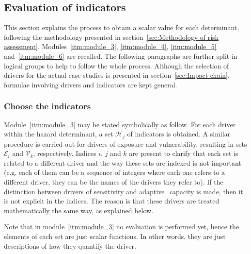 \subsection{Evaluation of indicators}
\label{sec:Evaluation of indicators}
This section explains the process to obtain a scalar value for each \gls{determinant}, following the methodology presented in section~\ref{sec:Methodology of risk assessment}. Modules~\ref{itm:module_3}, \ref{itm:module_4}, \ref{itm:module_5} and~\ref{itm:module_6} are recalled. The following paragraphs are further split in logical groups to help to follow the whole process.
Although the selection of \glspl{driver} for the actual case studies is presented in section~\ref{sec:Impact chain}, formulae involving \glspl{driver} and \glspl{indicator} are kept general.



\subsubsection{Choose the indicators}
Module~\ref{itm:module_3} may be stated symbolically as follow. For each \gls{driver} within the \gls{hazard} \gls{determinant}, a set $\mathcal{H}_j$ of \glspl{indicator} is obtained. A similar procedure is carried out for \glspl{driver} of \gls{exposure} and \gls{vulnerability}, resulting in sets $\mathcal{E}_i$ and $\mathcal{V}_k$, respectively. Indices $i$, $j$ and $k$ are present to clarify that each set is related to a different \gls{driver} and the way these sets are indexed is not important (e.g. each of them can be a sequence of integers where each one refers to a different \gls{driver}, they can be the names of the \glspl{driver} they refer to).
If the distinction between \glspl{driver} of \gls{sensitivity} and \gls{adaptive_capacity} is made, then it is not explicit in the indices. The reason is that these \glspl{driver} are treated mathematically the same way, as explained below.

Note that in module~\ref{itm:module_3} no evaluation is performed yet, hence the elements of each set are just scalar functions. In other words, they are just descriptions of how they quantify the \gls{driver}.

